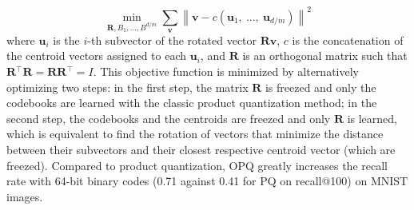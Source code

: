    \begin{equation}
      \min_{\mathbf{R}, B_1, \dots, B^{d/m}} \sum_{\mathbf{v}}
        \left\lVert \mathbf{v} -
                    c(\mathbf{u}_1,~\dots,~\mathbf{u}_{d/m}) \right\rVert^2
    \end{equation}
    where $\mathbf{u}_i$ is the $i$-th subvector of the rotated vector
    $\mathbf{R} \mathbf{v}$, $c$ is the concatenation of the centroid vectors
    assigned to each $\mathbf{u}_i$, and $\mathbf{R}$ is an orthogonal matrix
    such that $\mathbf{R}{}^\top \mathbf{R} = \mathbf{R} \mathbf{R}{}^\top = I$.
    This objective function is minimized by alternatively optimizing two steps:
    in the first step, the matrix $\mathbf{R}$ is freezed and only the codebooks
    are learned with the classic product quantization method; in the second
    step, the codebooks and the centroids are freezed and only $\mathbf{R}$ is
    learned, which is equivalent to find the rotation of vectors that minimize
    the distance between their subvectors and their closest respective centroid vector
    (which are freezed). Compared to product quantization, OPQ greatly increases
    the recall rate with 64-bit binary codes (0.71 against 0.41 for PQ on
    recall@100) on MNIST images.\medskip

